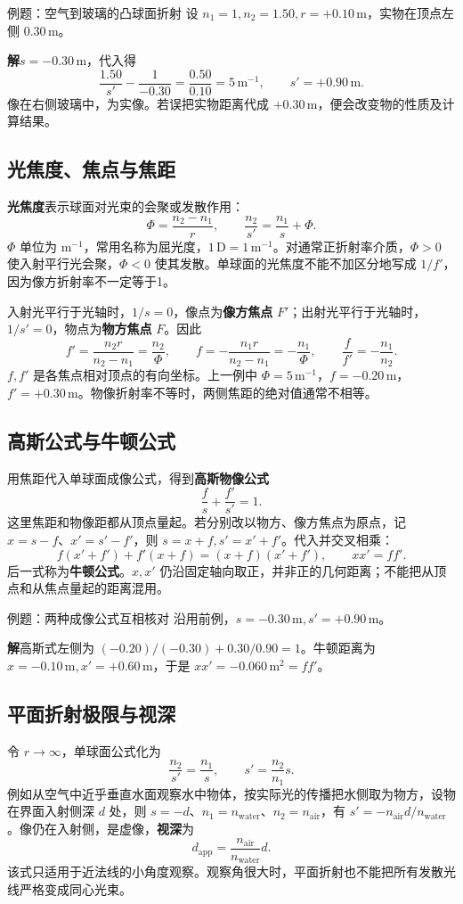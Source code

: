 \documentclass[UTF8,fontset=none,zihao=-4,a4paper]{ctexart}
\newcommand{\term}[1]{\textbf{#1}}
\newcommand{\unit}[1]{\,\mathrm{#1}}
\newcommand{\sol}{\par\noindent\textbf{解}\quad}
\begin{document}
\begin{infobox}{例题：空气到玻璃的凸球面折射}
设 $n_1=1,n_2=1.50,r=+0.10\unit m$，实物在顶点左侧 $0.30\unit m$。
\sol $s=-0.30\unit m$，代入得
\[
 \frac{1.50}{s'}-\frac1{-0.30}=\frac{0.50}{0.10}=5\unit{m^{-1}},
 \qquad s'=+0.90\unit m.
\]
像在右侧玻璃中，为实像。若误把实物距离代成 $+0.30\unit m$，便会改变物的性质及计算结果。
\end{infobox}

\subsection{光焦度、焦点与焦距}
\term{光焦度}表示球面对光束的会聚或发散作用：
\[
 \Phi=\frac{n_2-n_1}{r},\qquad
 \frac{n_2}{s'}=\frac{n_1}{s}+\Phi.
\]
$\Phi$ 单位为 $\mathrm{m^{-1}}$，常用名称为屈光度，$1\unit D=1\unit{m^{-1}}$。对通常正折射率介质，$\Phi>0$ 使入射平行光会聚，$\Phi<0$ 使其发散。单球面的光焦度不能不加区分地写成 $1/f'$，因为像方折射率不一定等于1。

入射光平行于光轴时，$1/s=0$，像点为\term{像方焦点} $F'$；出射光平行于光轴时，$1/s'=0$，物点为\term{物方焦点} $F$。因此
\[
 f'=\frac{n_2r}{n_2-n_1}=\frac{n_2}{\Phi},\qquad
 f=-\frac{n_1r}{n_2-n_1}=-\frac{n_1}{\Phi},\qquad
 \frac f{f'}=-\frac{n_1}{n_2}.
\]
$f,f'$ 是各焦点相对顶点的有向坐标。上一例中 $\Phi=5\unit{m^{-1}}$，$f=-0.20\unit m$，$f'=+0.30\unit m$。物像折射率不等时，两侧焦距的绝对值通常不相等。

\subsection{高斯公式与牛顿公式}
用焦距代入单球面成像公式，得到\term{高斯物像公式}
\[
 \frac fs+\frac{f'}{s'}=1.
\]
这里焦距和物像距都从顶点量起。若分别改以物方、像方焦点为原点，记 $x=s-f$、$x'=s'-f'$，则 $s=x+f,s'=x'+f'$。代入并交叉相乘：
\[
 f(x'+f')+f'(x+f)=(x+f)(x'+f'),
 \qquad xx'=ff'.
\]
后一式称为\term{牛顿公式}。$x,x'$ 仍沿固定轴向取正，并非正的几何距离；不能把从顶点和从焦点量起的距离混用。

\begin{infobox}[before skip=4pt,after skip=2pt]{例题：两种成像公式互相核对}
沿用前例，$s=-0.30\unit m,s'=+0.90\unit m$。
\sol 高斯式左侧为 $(-0.20)/(-0.30)+0.30/0.90=1$。牛顿距离为 $x=-0.10\unit m,x'=+0.60\unit m$，于是 $xx'=-0.060\unit{m^2}=ff'$。
\end{infobox}

\subsection{平面折射极限与视深}
令 $r\to\infty$，单球面公式化为
\[
 \frac{n_2}{s'}=\frac{n_1}{s},\qquad s'=\frac{n_2}{n_1}s.
\]
例如从空气中近乎垂直水面观察水中物体，按实际光的传播把水侧取为物方，设物在界面入射侧深 $d$ 处，则 $s=-d$、$n_1=n_{\mathrm{water}}$、$n_2=n_{\mathrm{air}}$，有 $s'=-n_{\mathrm{air}}d/n_{\mathrm{water}}$。像仍在入射侧，是虚像，\term{视深}为
\[
 d_{\mathrm{app}}=\frac{n_{\mathrm{air}}}{n_{\mathrm{water}}}d.
\]
该式只适用于近法线的小角度观察。观察角很大时，平面折射也不能把所有发散光线严格变成同心光束。
\end{document}
